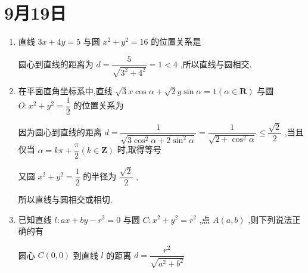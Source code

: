 \section*{9月19日}
\begin{enumerate}
    \item 直线 ${3x} + {4y} = 5$ 与圆 ${x}^{2} + {y}^{2} = {16}$ 的位置关系是
    \begin{jieda}
        圆心到直线的距离为 $d = \dfrac{5}{\sqrt{{3}^{2} + {4}^{2}}} = 1 < 4$ ,所以直线与圆相交.
    \end{jieda}
    \item 在平面直角坐标系中,直线 $\sqrt{3}x\cos \alpha  + \sqrt{2}y\sin \alpha  = 1\left( {\alpha  \in  \mathbf{R}}\right)$ 与圆 $O : {x}^{2} + {y}^{2} = \dfrac{1}{2}$ 的位置关系为
    \begin{jieda}
        因为圆心到直线的距离 $d = \dfrac{1}{\sqrt{3{\cos }^{2}\alpha  + 2{\sin }^{2}\alpha }} = \dfrac{1}{\sqrt{2 + {\cos }^{2}\alpha }} \leq  \dfrac{\sqrt{2}}{2}$ ,当且仅当 $\alpha  = {k\pi } + \dfrac{\pi }{2}\left( {k \in  \mathbf{Z}}\right)$ 时,取得等号
        
        又圆 ${x}^{2} + {y}^{2} = \dfrac{1}{2}$ 的半径为 $\dfrac{\sqrt{2}}{2}$ ,
        
        所以直线与圆相交或相切.
    \end{jieda}

    \item 已知直线 $l : {ax} + {by} - {r}^{2} = 0$ 与圆 $C : {x}^{2} + {y}^{2} = {r}^{2}$ ,点 $A\left( {a,b}\right)$ ,则下列说法正确的有
    \begin{jieda}
        圆心 $C\left( {0,0}\right)$ 到直线 $l$ 的距离 $d = \dfrac{{r}^{2}}{\sqrt{{a}^{2} + {b}^{2}}}$
\end{jieda}
\end{enumerate}
